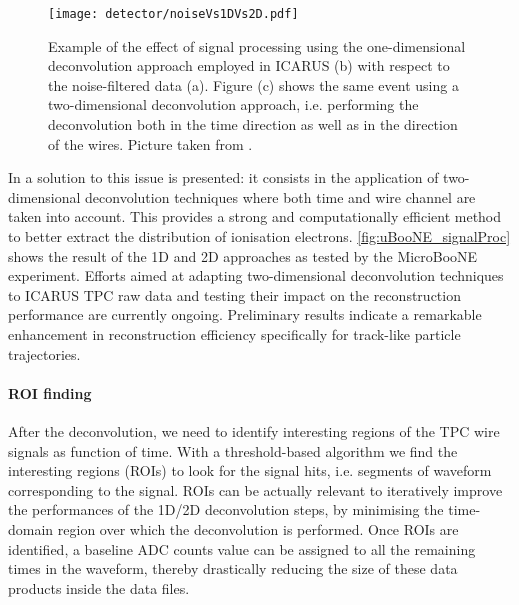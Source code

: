 \begin{figure}
    \centering
    \texttt{[image: detector/noiseVs1DVs2D.pdf]}
    \caption[TPC signal processing]{Example of the effect of signal processing using the one-dimensional deconvolution approach employed in ICARUS (b) with respect to the noise-filtered data (a). Figure (c) shows the same event using a two-dimensional deconvolution approach, i.e. performing the deconvolution both in the time direction as well as in the direction of the wires. Picture taken from \cite{MicroBooNE:2018swd}. }
    \label{fig:uBooNE_signalProc}
\end{figure}

In \cite{MicroBooNE:2018swd,MicroBooNE:2018vro} a solution to this issue is presented: it consists in the application of two-dimensional deconvolution techniques where both time and wire channel are taken into account. This provides a strong and computationally efficient method to better extract the distribution of ionisation electrons. \autoref{fig:uBooNE_signalProc} shows the result of the 1D and 2D approaches as tested by the MicroBooNE experiment. Efforts aimed at adapting two-dimensional deconvolution techniques to ICARUS TPC raw data and testing their impact on the reconstruction performance are currently ongoing. Preliminary results indicate a remarkable enhancement in reconstruction efficiency specifically for track-like particle trajectories.

\paragraph{ROI finding} After the deconvolution, we need to identify interesting regions of the TPC wire signals as function of time. With a threshold-based algorithm we find the interesting regions (ROIs) to look for the signal hits, i.e. segments of waveform corresponding to the signal. ROIs can be actually relevant to iteratively improve the performances of the 1D/2D deconvolution steps, by minimising the time-domain region over which the deconvolution is performed. Once ROIs are identified, a baseline ADC counts value can be assigned to all the remaining times in the waveform, thereby drastically reducing the size of these data products inside the data files. 


